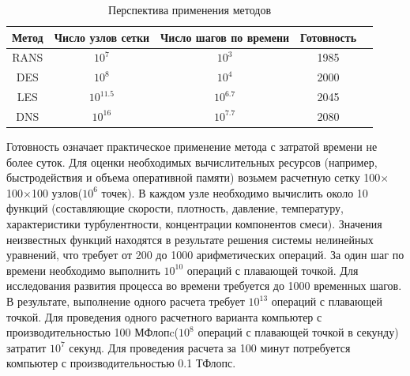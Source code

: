 	\begin{table}[H]
		\begin{center}
			\begin{tabular}{|c|c|c|c|c|}
				\hline
				Метод & Число узлов сетки & Число шагов по времени & Готовность\\
				\hline
				RANS & $10^7$ & $10^3$ & 1985\\
				\hline
				DES & $10^8$ & $10^4$ & 2000\\
				\hline
				LES & $10^{11.5}$ & $10^{6.7}$ & 2045\\
				\hline
				DNS & $10^{16}$ & $10^{7.7}$ & 2080\\
				\hline
			\end{tabular}
		\end{center}
		\caption{Перспектива применения методов}
	\end{table}
	Готовность означает практическое применение метода с затратой времени не более суток.
	Для оценки необходимых вычислительных ресурсов (например, быстродействия и объема оперативной памяти) возьмем расчетную сетку 100$\times$100$\times$100 узлов($10^6$ точек). В каждом узле необходимо вычислить около 10 функций (составляющие скорости, плотность, давление, температуру, характеристики турбулентности, концентрации компонентов смеси). Значения неизвестных функций находятся в результате решения системы нелинейных уравнений, что требует от 200 до 1000 арифметических операций. За один шаг по времени необходимо выполнить $10^{10}$ операций с плавающей точкой. Для исследования развития процесса во времени требуется до 1000 временных шагов. В результате, выполнение одного расчета требует $10^{13}$ операций с плавающей точкой. Для проведения одного расчетного варианта компьютер с производительностью 100 МФлопc($10^8$ операций с плавающей точкой в секунду) затратит $10^7$ секунд. Для проведения расчета за 100 минут потребуется компьютер с производительностью 0.1 ТФлопс.